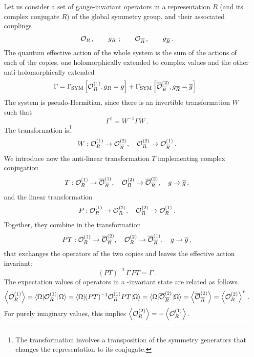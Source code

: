 Let us consider a set of gauge-invariant operators in a representation $R$ (and its complex conjugate $\overline{R}$) of the global symmetry group, and their associated couplings
\begin{equation}
	\mathcal{O}_R\,,\qquad g_R\ ;\qquad \mathcal{O}_{\overline{R}}\,,\qquad g_{\overline{R}}\,.
\end{equation}
The quantum effective action of the whole system is the sum of the actions of each of the copies, one holomorphically extended to complex values and the other anti-holomorphically extended
\begin{equation}
	\Gamma=\Gamma_{\text{SYM}}\left[\mathcal{O}_R^{(1)},g_R=g\right]+\Gamma_{\text{SYM}}\left[\overline{\mathcal{O}}_{\overline{R}}^{(2)},g_{\overline{R}}=\overline{g}\right]\,.
\end{equation}
The system is pseudo-Hermitian, since there is an invertible transformation $W$ such that
\begin{equation}
\Gamma^\dagger=    W^{-1} \Gamma W\,.
\end{equation}
The transformation is\footnote{The transformation involves a transposition of the symmetry generators that changes the representation to its conjugate.}
\begin{equation}
	W: \mathcal{O}^{(1)}_R\to \mathcal{O}^{(2)}_{\overline{R}},\quad \mathcal{O}^{(2)}_R\to \mathcal{O}^{(1)}_{\overline{R}}\,.
\end{equation}
We introduce now the anti-linear transformation $T$ implementing complex conjugation
\begin{equation}
	T: \mathcal{O}^{(1)}_R\to \overline{\mathcal{O}}^{(1)}_{\overline{R}} ,\quad  \mathcal{O}^{(2)}_R\to \overline{\mathcal{O}}^{(2)}_{\overline{R}} ,\quad g\to \overline{g}\,,
\end{equation}
and the linear transformation
\begin{equation}
	P: \mathcal{O}^{(1)}_R\to \mathcal{O}^{(2)}_R,\quad \mathcal{O}^{(2)}_R\to \mathcal{O}^{(1)}_R\,.
\end{equation}
Together, they combine in the \PT transformation
\begin{equation}
	PT: \mathcal{O}^{(1)}_R\to \overline{\mathcal{O}}^{(2)}_{\overline{R}}, \quad \mathcal{O}^{(2)}_R\to \overline{\mathcal{O}}^{(1)}_{\overline{R}},\quad g\to \overline{g}\,,
\end{equation}
that exchanges the operators of the two copies and leaves the effective action invariant:
\begin{equation}
   (PT)^{-1}\, \Gamma\, PT=\Gamma\,.
\end{equation}
The expectation values of operators in a \PT-invariant state are related as follows
\begin{equation}
	\left\langle{\mathcal{O}_R^{(1)}}\right\rangle=\langle \Omega| \mathcal{O}_R^{(1)} |\Omega\rangle=\langle \Omega| (PT)^{-1}\mathcal{O}_R^{(1)} PT|\Omega\rangle=\langle \Omega| \overline{\mathcal{O}}_{\overline{R}}^{(2)} |\Omega\rangle=\left\langle{\overline{\mathcal{O}}_{\overline{R}}^{(2)}}\right\rangle=\left\langle{\mathcal{O}_R^{(2)}}\right\rangle^*\,.
\end{equation}
For purely imaginary values, this implies $\left\langle{\mathcal{O}_R^{(2)}}\right\rangle=-\left\langle{\mathcal{O}_R^{(1)}}\right\rangle$.

